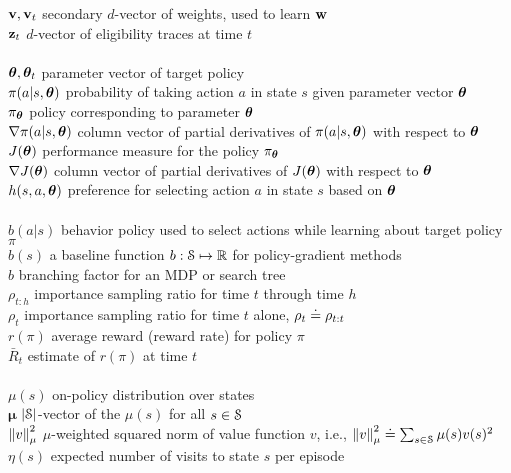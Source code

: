 \documentclass[10pt,fleqn]{article}
\begin{document}
\begin{tabbing}
\>$\v,\v_t$           \> secondary $d$-vector of weights, used to learn $\w$ \\
\>$\z_t$              \> $d$-vector of eligibility traces at time $t$ \\
\\
\>$\th, \th_t$        \> parameter vector of target policy \\
\>$\pi(a|s,\th)$      \> probability of taking action $a$ in state $s$ given parameter vector $\th$\\
\>$\pi_\th$           \> policy corresponding to parameter $\th$\\
\>$\grad\pi(a|s,\th)$ \>column vector of partial derivatives of $\pi(a|s,\th)$ with respect to $\th$\\
\>$J(\th)$            \> performance measure for the policy $\pi_\th$\\
\>$\grad J(\th)$      \> column vector of partial derivatives of $J(\th)$ with respect to $\th$\\
\>$h(s,a,\th)$        \> preference for selecting action $a$ in state $s$ based on $\th$\\
\\
\>$b(a|s)$            \> behavior policy used to select actions while learning about target policy $\pi$ \\
\>$b(s)$              \> a baseline function $b:\S\mapsto\Re$ for policy-gradient methods\\
\>$b$                 \> branching factor for an MDP or search tree \\
\>$\rho_{t:h}$        \> importance sampling ratio for time $t$ through time $h$ \\
\>$\rho_{t}$          \> importance sampling ratio for time $t$ alone, $\rho_t\defeq\rho_{t:t}$\\
\>$r(\pi)$            \> average reward (reward rate) for policy $\pi$ \\
\>$\bar R_t$          \> estimate of $r(\pi)$ at time $t$\\
\\
\>$\mu(s)$            \> on-policy distribution over states \\
\>$\bm\mu$            \> $|\S|$-vector of the $\mu(s)$ for all $s\in\S$\\
\>$\norm{v}$          \> $\mu$-weighted squared norm of value function $v$, i.e., $\norm{v}\defeq\sum_{s\in\S} \mu(s)v(s)^2$\\
\>$\eta(s)$           \> expected number of visits to state $s$ per episode\\

\end{tabbing}
\end{document}
